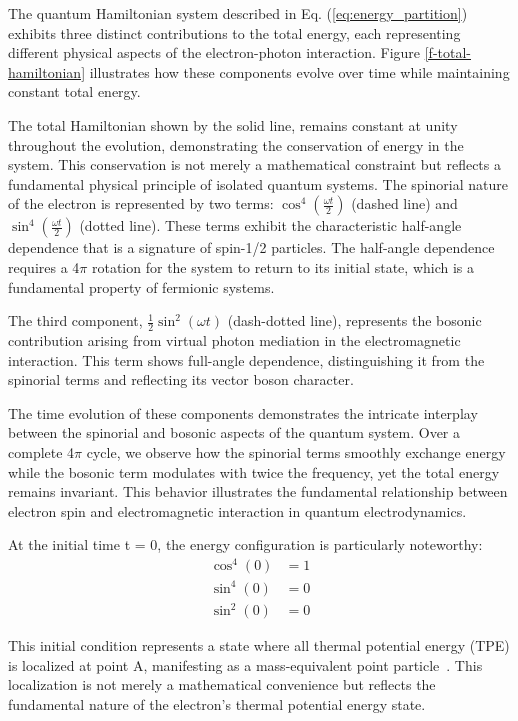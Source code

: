 \documentclass[%
 reprint,
 amsmath,amssymb,
 aps,
]{revtex4-1}
\numberwithin{equation}{section}%
\begin{document}
The quantum Hamiltonian system described in Eq. (\ref{eq:energy_partition}) exhibits three distinct contributions to the total energy, each representing different physical aspects of the electron-photon interaction. Figure \ref{f-total-hamiltonian} illustrates how these components evolve over time while maintaining constant total energy.


The total Hamiltonian shown by the solid line, remains constant at unity throughout the evolution, demonstrating the conservation of energy in the system. This conservation is not merely a mathematical constraint but reflects a fundamental physical principle of isolated quantum systems.
The spinorial nature of the electron is represented by two terms: $\cos^4\left(\frac{\omega t}{2}\right)$ (dashed line) and $\sin^4\left(\frac{\omega t}{2}\right)$ (dotted line). These terms exhibit the characteristic half-angle dependence that is a signature of spin-1/2 particles. The half-angle dependence requires a 4$\pi$ rotation for the system to return to its initial state, which is a fundamental property of fermionic systems.

The third component, $\frac{1}{2}\sin^2\left(\omega t\right)$ (dash-dotted line), represents the bosonic contribution arising from virtual photon mediation in the electromagnetic interaction. This term shows full-angle dependence, distinguishing it from the spinorial terms and reflecting its vector boson character.


The time evolution of these components demonstrates the intricate interplay between the spinorial and bosonic aspects of the quantum system. Over a complete 4$\pi$ cycle, we observe how the spinorial terms smoothly exchange energy while the bosonic term modulates with twice the frequency, yet the total energy remains invariant. This behavior illustrates the fundamental relationship between electron spin and electromagnetic interaction in quantum electrodynamics.


At the initial time t = 0, the energy configuration is particularly noteworthy:
\begin{equation}
    \begin{split}
        \cos^4(0) &= 1 \\
        \sin^4(0) &= 0 \\
        \sin^2(0) &= 0
    \end{split}
    \label{eq:initial_condition}
\end{equation}

This initial condition represents a state where all thermal potential energy (TPE) is localized at point A, manifesting as a mass-equivalent point particle~\cite{hanamura2018}. This localization is not merely a mathematical convenience but reflects the fundamental nature of the electron's thermal potential energy state.
\end{document}
